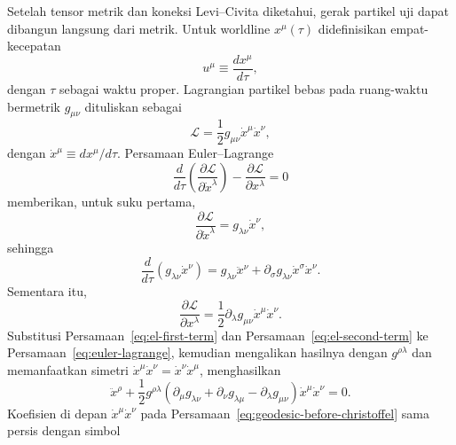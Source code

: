 Setelah tensor metrik dan koneksi Levi--Civita diketahui, gerak partikel uji
dapat dibangun langsung dari metrik. Untuk worldline $x^\mu(\tau)$
didefinisikan empat-kecepatan
\begin{equation}
    u^\mu\equiv\frac{dx^\mu}{d\tau},
    \label{eq:four-velocity}
\end{equation}
dengan $\tau$ sebagai waktu proper. Lagrangian partikel bebas pada ruang-waktu
bermetrik $g_{\mu\nu}$ dituliskan sebagai
\begin{equation}
    \mathcal{L}
    =\frac{1}{2}g_{\mu\nu}\dot{x}^\mu\dot{x}^\nu,
    \label{eq:lagrangian}
\end{equation}
dengan $\dot{x}^\mu\equiv dx^\mu/d\tau$. Persamaan Euler--Lagrange
\begin{equation}
    \frac{d}{d\tau}\left(
        \frac{\partial\mathcal{L}}{\partial\dot{x}^\lambda}
    \right)
    -\frac{\partial\mathcal{L}}{\partial x^\lambda}=0
    \label{eq:euler-lagrange}
\end{equation}
memberikan, untuk suku pertama,
\begin{equation}
    \frac{\partial\mathcal{L}}{\partial\dot{x}^\lambda}
    =g_{\lambda\nu}\dot{x}^\nu,
\end{equation}
sehingga
\begin{equation}
    \frac{d}{d\tau}
    \left(g_{\lambda\nu}\dot{x}^\nu\right)
    =g_{\lambda\nu}\ddot{x}^\nu
    +\partial_\sigma g_{\lambda\nu}
     \dot{x}^\sigma\dot{x}^\nu.
    \label{eq:el-first-term}
\end{equation}
Sementara itu,
\begin{equation}
    \frac{\partial\mathcal{L}}{\partial x^\lambda}
    =\frac{1}{2}
    \partial_\lambda g_{\mu\nu}
    \dot{x}^\mu\dot{x}^\nu.
    \label{eq:el-second-term}
\end{equation}
Substitusi Persamaan~\eqref{eq:el-first-term} dan
Persamaan~\eqref{eq:el-second-term} ke Persamaan~\eqref{eq:euler-lagrange},
kemudian mengalikan hasilnya dengan $g^{\rho\lambda}$ dan memanfaatkan
simetri $\dot{x}^\mu\dot{x}^\nu=\dot{x}^\nu\dot{x}^\mu$, menghasilkan
\begin{equation}
    \ddot{x}^\rho
    +\frac{1}{2}g^{\rho\lambda}
    \left(
        \partial_\mu g_{\lambda\nu}
        +\partial_\nu g_{\lambda\mu}
        -\partial_\lambda g_{\mu\nu}
    \right)
    \dot{x}^\mu\dot{x}^\nu=0.
    \label{eq:geodesic-before-christoffel}
\end{equation}
Koefisien di depan $\dot{x}^\mu\dot{x}^\nu$ pada
Persamaan~\eqref{eq:geodesic-before-christoffel} sama persis dengan simbol
